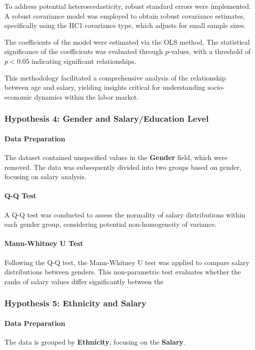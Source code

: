 To address potential heteroscedasticity, robust standard errors were implemented. A robust covariance model was employed to obtain robust covariance estimates, specifically using the HC1 covariance type, which adjusts for small sample sizes.

The coefficients of the model were estimated via the OLS method. The statistical significance of the coefficients was evaluated through \( p \)-values, with a threshold of \( p < 0.05 \) indicating significant relationships.

This methodology facilitated a comprehensive analysis of the relationship between age and salary, yielding insights critical for understanding socio-economic dynamics within the labor market.

\subsubsection{Hypothesis 4: Gender and Salary/Education Level}

\paragraph{Data Preparation}
The dataset contained unspecified values in the \textbf{Gender} field, which were removed. The data was subsequently divided into two groups based on gender, focusing on salary analysis.

\paragraph{Q-Q Test}
A Q-Q test was conducted to assess the normality of salary distributions within each gender group, considering potential non-homogeneity of variance.

\paragraph{Mann-Whitney U Test}
Following the Q-Q test, the Mann-Whitney U test was applied to compare salary distributions between genders. This non-parametric test evaluates whether the ranks of salary values differ significantly between the

\subsubsection{Hypothesis 5: Ethnicity and Salary}

\paragraph{Data Preparation}
The data is grouped by \textbf{Ethnicity}, focusing on the \textbf{Salary}.

